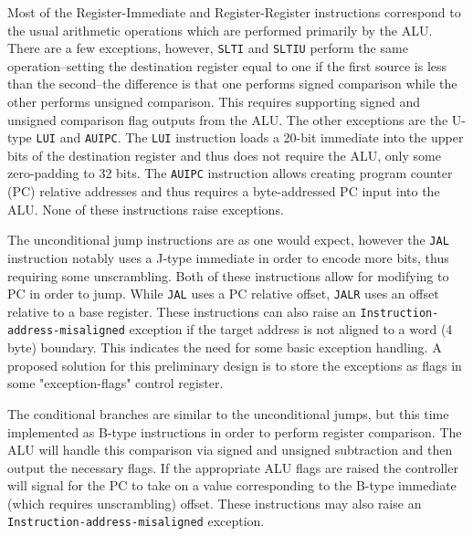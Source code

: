 \documentclass[lettersize,journal]{IEEEtran}
\begin{document}
Most of the Register-Immediate and Register-Register instructions correspond to the usual arithmetic operations which are performed primarily by the ALU.
There are a few exceptions, however, \verb|SLTI| and \verb|SLTIU| perform the same operation--setting the destination register equal to one if the first source is less than the second--the difference is that one performs signed comparison while the other performs unsigned comparison.
This requires supporting signed and unsigned comparison flag outputs from the ALU.
The other exceptions are the U-type \verb|LUI| and \verb|AUIPC|.
The \verb|LUI| instruction loads a 20-bit immediate into the upper bits of the destination register and thus does not require the ALU, only some zero-padding to 32 bits.
The \verb|AUIPC| instruction allows creating program counter (PC) relative addresses and thus requires a byte-addressed PC input into the ALU.
None of these instructions raise exceptions.

The unconditional jump instructions are as one would expect, however the \verb|JAL| instruction notably uses a J-type immediate in order to encode more bits, thus requiring some unscrambling.
Both of these instructions allow for modifying to PC in order to jump. While \verb|JAL| uses a PC relative offset, \verb|JALR| uses an offset relative to a base register.
These instructions can also raise an \verb|Instruction-address-misaligned| exception if the target address is not aligned to a word (4 byte) boundary.
This indicates the need for some basic exception handling.
A proposed solution for this preliminary design is to store the exceptions as flags in some "exception-flags" control register.

The conditional branches are similar to the unconditional jumps, but this time implemented as B-type instructions in order to perform register comparison.
The ALU will handle this comparison via signed and unsigned subtraction and then output the necessary flags.
If the appropriate ALU flags are raised the controller will signal for the PC to take on a value corresponding to the B-type immediate (which requires unscrambling) offset.
These instructions may also raise an \verb|Instruction-address-misaligned| exception.
\end{document}
